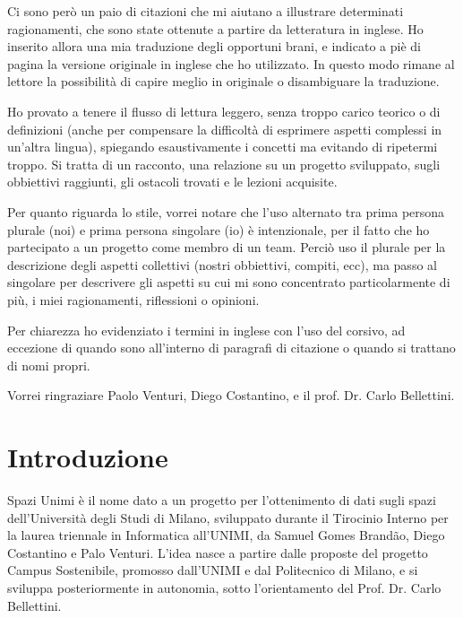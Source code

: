 \documentclass[12pt]{report}
\begin{document}
Ci sono però un paio di citazioni che mi aiutano a illustrare determinati
ragionamenti, che sono state ottenute a partire da letteratura in inglese.
Ho inserito allora una mia traduzione degli opportuni brani, e indicato
a piè di pagina la versione originale in inglese che ho utilizzato. In questo
modo rimane al lettore la possibilità di capire meglio in originale
o disambiguare la traduzione.

Ho provato a tenere il flusso di lettura leggero, senza troppo carico
teorico o di definizioni (anche per compensare la difficoltà di esprimere
aspetti complessi in un'altra lingua), spiegando esaustivamente i 
concetti ma evitando di ripetermi troppo. Si tratta di un racconto, 
una relazione su un progetto sviluppato, sugli obbiettivi raggiunti, 
gli ostacoli trovati e le lezioni acquisite.

Per quanto riguarda lo stile, vorrei notare che l'uso alternato tra prima
persona plurale (noi) e prima persona singolare (io) è intenzionale, per
il fatto che ho partecipato a un progetto come membro di un team. Perciò
uso il plurale per la descrizione degli aspetti collettivi 
(nostri obbiettivi, compiti, ecc), ma passo al singolare per descrivere gli
aspetti su cui mi sono concentrato particolarmente di più, i miei
ragionamenti, riflessioni o opinioni.

Per chiarezza ho evidenziato i termini in inglese con l'uso del corsivo, 
ad eccezione di quando sono all'interno di paragrafi di citazione o quando
si trattano di nomi propri.

%
%
%
%
Vorrei ringraziare Paolo Venturi, Diego Costantino, 
e il prof. Dr. Carlo Bellettini. 
\afterpreface


% 
% 
\chapter{Introduzione}
\label{cap1}

Spazi Unimi è il nome dato a un progetto per l'ottenimento di dati sugli 
spazi dell’Università degli Studi di Milano, sviluppato durante il 
Tirocinio Interno per la laurea triennale in Informatica all’UNIMI, 
da Samuel Gomes Brandão, Diego Costantino e Palo Venturi. L'idea 
nasce a partire dalle proposte del progetto Campus Sostenibile, 
promosso dall’UNIMI e dal Politecnico di Milano, e si sviluppa 
posteriormente in autonomia, sotto l'orientamento del Prof. Dr. Carlo Bellettini.
\end{document}
